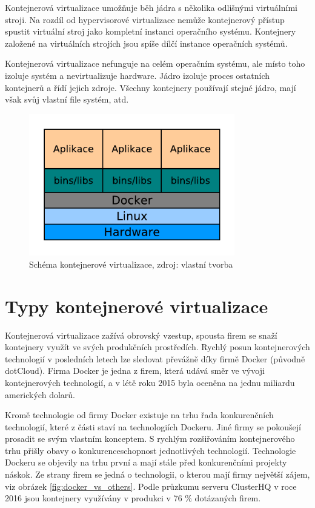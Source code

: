 Kontejnerová virtualizace umožňuje běh jádra s několika odlišnými virtuálními stroji. Na rozdíl od hypervisorové virtualizace nemůže kontejnerový přístup spustit virtuální stroj jako kompletní instanci operačního systému. Kontejnery založené na virtuálních strojích jsou spíše dílčí instance operačních systémů.

Kontejnerová virtualizace nefunguje na celém operačním systému, ale místo toho izoluje systém a nevirtualizuje hardware. Jádro izoluje proces ostatních kontejnerů a řídí jejich zdroje. Všechny kontejnery používají stejné jádro, mají však svůj vlastní file systém, atd.

\begin{figure}[H]
\begin{centering}
\includegraphics[width=0.8\textwidth]{img/containervirt.pdf}
\par\end{centering}
\caption{Schéma kontejnerové virtualizace, zdroj: vlastní tvorba} \label{fig:containervirt}
\end{figure}

\section{Typy kontejnerové virtualizace}
Kontejnerová virtualizace zažívá obrovský vzestup, spousta firem se snaží kontejnery využít ve svých produkčních prostředích. Rychlý posun kontejnerových technologií v posledních letech lze sledovat převážně díky firmě Docker (původně dotCloud)\cite{dotcloud_docker}. Firma Docker je jedna z firem, která udává směr ve vývoji kontejnerových technologií, a v létě roku 2015 byla oceněna na jednu miliardu amerických dolarů\cite{docker_mil}. 

Kromě technologie od firmy Docker existuje na trhu řada konkurenčních technologií, které z části staví na technologiích Dockeru. Jiné firmy se pokoušejí prosadit se svým vlastním konceptem. S rychlým rozšiřováním kontejnerového trhu přišly obavy o konkurenceschopnost jednotlivých technologií. Technologie Dockeru se objevily na trhu první a mají stále před konkurenčními projekty náskok. Ze strany firem se jedná o technologii, o kterou mají firmy největší zájem, viz obrázek \ref{fig:docker_vs_others}. Podle průzkumu serveru ClusterHQ v roce 2016 jsou kontejnery využívány v produkci v 76 \% dotázaných firem\cite{cluster_vyzkum}.

